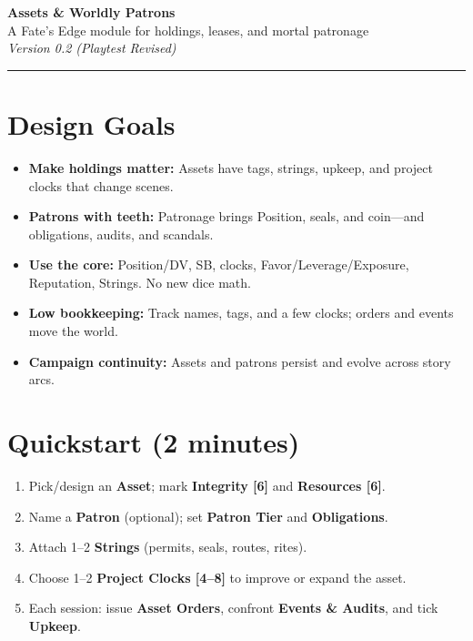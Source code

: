 \documentclass[11pt]{article}
\begin{document}
\begin{center}
{\LARGE \textbf{Assets \& Worldly Patrons}}\\[3pt]
{\large A Fate's Edge module for holdings, leases, and mortal patronage}\\[2pt]
\textit{Version 0.2 (Playtest Revised)}
\end{center}
\vspace{0.25em}
\hrule\vspace{0.75em}

\section*{Design Goals}
\begin{itemize}
  \item \textbf{Make holdings matter:} Assets have tags, strings, upkeep, and project clocks that change scenes.
  \item \textbf{Patrons with teeth:} Patronage brings Position, seals, and coin---and obligations, audits, and scandals.
  \item \textbf{Use the core:} Position/DV, SB, clocks, Favor/Leverage/Exposure, Reputation, Strings. No new dice math.
  \item \textbf{Low bookkeeping:} Track names, tags, and a few clocks; orders and events move the world.
  \item \textbf{Campaign continuity:} Assets and patrons persist and evolve across story arcs.
\end{itemize}

\section*{Quickstart (2 minutes)}
\begin{enumerate}
  \item Pick/design an \textbf{Asset}; mark \textbf{Integrity [6]} and \textbf{Resources [6]}.
  \item Name a \textbf{Patron} (optional); set \textbf{Patron Tier} and \textbf{Obligations}.
  \item Attach 1--2 \textbf{Strings} (permits, seals, routes, rites).
  \item Choose 1--2 \textbf{Project Clocks [4--8]} to improve or expand the asset.
  \item Each session: issue \textbf{Asset Orders}, confront \textbf{Events \& Audits}, and tick \textbf{Upkeep}.
\end{enumerate}
\end{document}
